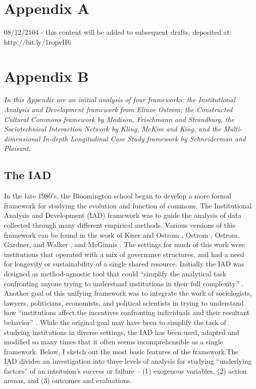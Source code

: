 \section{Appendix A}

08/12/2104 - this content will be added to subsequent drafts, deposited at:
http://bit.ly/1ropvH6


\section{Appendix B}

\textit{In this Appendix are an initial analysis of four frameworks: the Institutional
Analysis and Development framework from Elinor Ostrom; the Constructed
Cultural Commons framework by Madison, Frischmann and Strandburg, the
Sociotechnical Interaction Network by Kling, McKim and King, and the
Multi-dimensional In-depth Longitudinal Case Study framework by
Schneiderman and Plaisant.}
\\
\subsection*{The IAD}

In the late 1980's, the
Bloomington school began to develop a more formal framework for studying
the evolution and function of commons. The Institutional Analysis and
Development (IAD) framework was to guide the analysis of data collected
through many different empirical methods. Various versions of this
framework can be found in the work of Kiser and Ostrom \citeyearpar{kiser2000three}, Ostrom
\citeyearpar{ostrom1990governing}, Ostrom, Gardner, and Walker , and McGinnis \citeyearpar{mcginnis2011introduction}. The settings for much of this work
were institutions that operated with a mix of governance structures, and
had a need for longevity or sustainability of a single shared resource.
Initially the IAD was designed as method-agnostic tool that could
``simplify the analytical task confronting anyone trying to understand
institutions in their full complexity.'' \citeyearpar{mcginnis2011introduction}.\\ 

Another goal of this unifying framework was to integrate the work of sociologists,
lawyers, politicians, economists, and political scientists in trying to
understand how ``institutions affect the incentives confronting
individuals and their resultant behavior'' \citep{ostrom2009understanding}. While the
original goal may have been to simplify the task of studying
institutions in diverse settings, the IAD has been used, adapted and
modified so many times that it often seems incomprehensible as a single
framework. Below, I sketch out the most basic features of the
framework.The IAD divides an investigation into three levels of analysis
for studying ``underlying factors'' of an intsituion's success or
failure -- (1) exogenous variables, (2) action arenas, and (3) outcomes
and evaluations.\\

